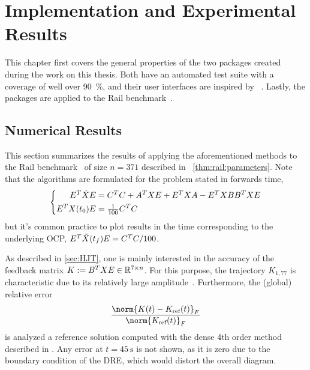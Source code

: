 \chapter{Implementation and Experimental Results}

This chapter first covers the general properties of the two packages created during the work on this thesis.
Both have an automated test suite with a coverage of well over \SI{90}{\percent},
and their user interfaces are inspired by ~\cite{DifferentialEquations}.
Lastly, the packages are applied to
the Rail benchmark~\cite{morwiki_steel}.




\section{Numerical Results}

This section summarizes the results of applying the aforementioned methods to
the Rail benchmark~\cite{morwiki_steel} of size $n=371$
described in \eg~\autoref{thm:rail:parameters}.
Note that the algorithms are formulated for the problem stated in forwards time,
\begin{equation}
\left\{
\begin{aligned}
  E^T \dot X E &= C^T C + A^T X E + E^T X A - E^T X BB^T X E \\
  E^T X(t_0) E &= \tfrac{1}{100} C^T C
\end{aligned}
\right.
\end{equation}
but it's common practice to plot results in the time corresponding to the underlying \ac{OCP},
\ie $E^T \tilde X(t_f) E = C^T C/100$.

As described in \autoref{sec:HJT},
one is mainly interested in the accuracy of the feedback matrix
$
  K := B^T X E \in \mathbb{R}^{7 \times n}
$.
For this purpose, the trajectory $K_{1,77}$ is characteristic due to its relatively large amplitude~\cite{Lang2015}.
Furthermore, the (global) relative error
\begin{equation}
\label{eq:results:err:ref}
  \frac{\norm{K(t) - K_\text{ref}(t)}_F}{\norm{K_\text{ref}(t)}_F}
\end{equation}
is analyzed \wrt a reference solution computed with the dense 4th order method described in \cite[Appendix~A]{Lang2017}.
Any error at $t=\SI{45}{\second}$ is not shown,
as it is zero due to the boundary condition of the \ac{DRE},
which would distort the overall diagram.

